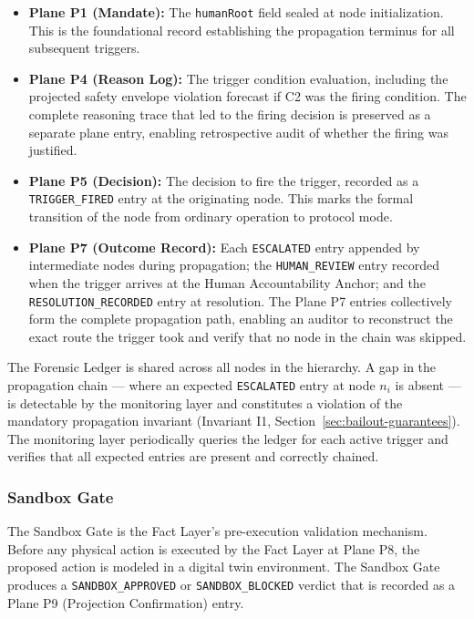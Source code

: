 \begin{itemize}
  \item \textbf{Plane P1 (Mandate):} The \texttt{humanRoot} field sealed at node initialization. This is the foundational record establishing the propagation terminus for all subsequent triggers.

  \item \textbf{Plane P4 (Reason Log):} The trigger condition evaluation, including the projected safety envelope violation forecast if C2 was the firing condition. The complete reasoning trace that led to the firing decision is preserved as a separate plane entry, enabling retrospective audit of whether the firing was justified.

  \item \textbf{Plane P5 (Decision):} The decision to fire the trigger, recorded as a \texttt{TRIGGER\_FIRED} entry at the originating node. This marks the formal transition of the node from ordinary operation to protocol mode.

  \item \textbf{Plane P7 (Outcome Record):} Each \texttt{ESCALATED} entry appended by intermediate nodes during propagation; the \texttt{HUMAN\_REVIEW} entry recorded when the trigger arrives at the Human Accountability Anchor; and the \texttt{RESOLUTION\_RECORDED} entry at resolution. The Plane P7 entries collectively form the complete propagation path, enabling an auditor to reconstruct the exact route the trigger took and verify that no node in the chain was skipped.
\end{itemize}

The Forensic Ledger is shared across all nodes in the hierarchy. A gap in the propagation chain --- where an expected \texttt{ESCALATED} entry at node $n_i$ is absent --- is detectable by the monitoring layer and constitutes a violation of the mandatory propagation invariant (Invariant I1, Section~\ref{sec:bailout-guarantees}). The monitoring layer periodically queries the ledger for each active trigger and verifies that all expected entries are present and correctly chained.

\subsubsection{Sandbox Gate}
\label{sec:sandbox-gate}

The Sandbox Gate is the Fact Layer's pre-execution validation mechanism. Before any physical action is executed by the Fact Layer at Plane P8, the proposed action is modeled in a digital twin environment. The Sandbox Gate produces a \texttt{SANDBOX\_APPROVED} or \texttt{SANDBOX\_BLOCKED} verdict that is recorded as a Plane P9 (Projection Confirmation) entry.

